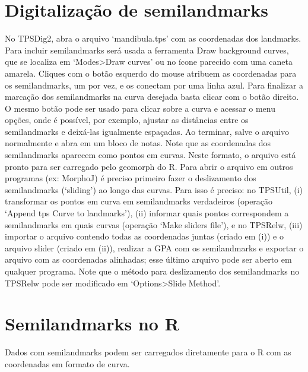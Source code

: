 \documentclass[
]{book}
\begin{document}
\section{Digitalização de semilandmarks}\label{digitalizauxe7uxe3o-de-semilandmarks}

No TPSDig2, abra o arquivo `mandibula.tps' com as coordenadas dos landmarks. Para incluir semilandmarks será usada a ferramenta Draw background curves, que se localiza em `Modes\textgreater Draw curves' ou no ícone parecido com uma caneta amarela. Cliques com o botão esquerdo do mouse atribuem as coordenadas para os semilandmarks, um por vez, e os conectam por uma linha azul. Para finalizar a marcação dos semilandmarks na curva desejada basta clicar com o botão direito. O mesmo botão pode ser usado para clicar sobre a curva e acessar o menu opções, onde é possível, por exemplo, ajustar as distâncias entre os semilandmarks e deixá-las igualmente espaçadas. Ao terminar, salve o arquivo normalmente e abra em um bloco de notas. Note que as coordenadas dos semilandmarks aparecem como pontos em curvas. Neste formato, o arquivo está pronto para ser carregado pelo geomorph do R.
Para abrir o arquivo em outros programas (ex: MorphoJ) é preciso primeiro fazer o deslizamento dos semilandmarks (`sliding') ao longo das curvas. Para isso é preciso: no TPSUtil, (i) transformar os pontos em curva em semilandmarks verdadeiros (operação `Append tps Curve to landmarks'), (ii) informar quais pontos correspondem a semilandmarks em quais curvas (operação `Make sliders file'), e no TPSRelw, (iii) importar o arquivo contendo todas as coordenadas juntas (criado em (i)) e o arquivo slider (criado em (ii)), realizar a GPA com os semilandmarks e exportar o arquivo com as coordenadas alinhadas; esse último arquivo pode ser aberto em qualquer programa. Note que o método para deslizamento dos semilandmarks no TPSRelw pode ser modificado em `Options\textgreater Slide Method'.

\section{Semilandmarks no R}\label{semilandmarks-no-r}

Dados com semilandmarks podem ser carregados diretamente para o R com as coordenadas em formato de curva.
\end{document}
